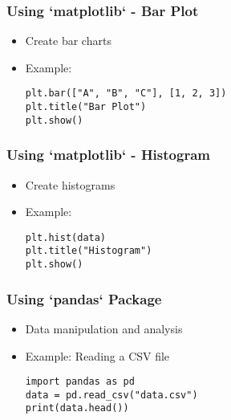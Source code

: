 \documentclass{beamer}
\begin{document}
\begin{frame}
    \frametitle{Using `matplotlib` - Bar Plot}
    \begin{itemize}
        \item Create bar charts
        \item Example:
        \begin{tcolorbox}[colback=lightblue, colframe=darkblue, title=Bar Plot]
            \lstinline|plt.bar(["A", "B", "C"], [1, 2, 3])| \\
            \lstinline|plt.title("Bar Plot")| \\
            \lstinline|plt.show()|
        \end{tcolorbox}
    \end{itemize}
\end{frame}

\begin{frame}
    \frametitle{Using `matplotlib` - Histogram}
    \begin{itemize}
        \item Create histograms
        \item Example:
        \begin{tcolorbox}[colback=lightblue, colframe=darkblue, title=Histogram]
            \lstinline|plt.hist(data)| \\
            \lstinline|plt.title("Histogram")| \\
            \lstinline|plt.show()|
        \end{tcolorbox}
    \end{itemize}
\end{frame}


\begin{frame}
    \frametitle{Using `pandas` Package}
    \begin{itemize}
        \item Data manipulation and analysis
        \item Example: Reading a CSV file
        \begin{tcolorbox}[colback=lightblue, colframe=darkblue, title=Read CSV]
            \lstinline|import pandas as pd| \\
            \lstinline|data = pd.read_csv("data.csv")| \\
            \lstinline|print(data.head())|
        \end{tcolorbox}
    \end{itemize}
\end{frame}
\end{document}
